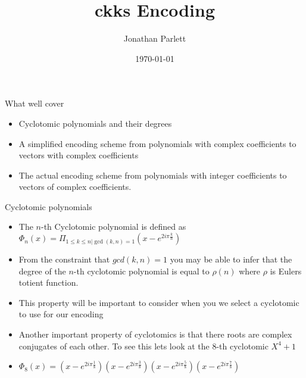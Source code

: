 \documentclass{beamer}
\title{ckks Encoding}
\author{Jonathan Parlett}
\date{\today}
\begin{document}
\begin{frame}
    \titlepage
\end{frame}


\begin{frame}{What well cover}
	\begin{itemize}[<+->]
		\item Cyclotomic polynomials and their degrees
		\item A simplified encoding scheme from polynomials with complex coefficients to
		vectors with complex coefficients
		\item The actual encoding scheme from polynomials with integer coefficients
		to vectors of complex coefficients. 
	\end{itemize}
\end{frame}

\begin{frame}{Cyclotomic polynomials}
	\begin{itemize}[<+->]
		\item The $n$-th Cyclotomic polynomial is defined as $\Phi_n(x) = \Pi_{1 \le k \le n | \gcd(k,n) = 1} (x - e^{2i\pi\frac{k}{n}})$
		\item From the constraint that $gcd(k,n) = 1$ you may be able to infer that the degree of the $n$-th
		cyclotomic polynomial is equal to $\rho(n)$ where $\rho$ is Eulers totient function.
		\item This property will be important to consider when you we select a cyclotomic to use for our
		encoding
		\item Another important property of cyclotomics is that there roots are complex conjugates
		of each other. To see this lets look at the 8-th cyclotomic $X^4 + 1$
		\item $\Phi_8(x) = (x - e^{2i \pi \frac{1}{8}})(x - e^{2i \pi \frac{3}{8}})(x - e^{2i \pi \frac{5}{8}})(x - e^{2i \pi \frac{7}{8}})$
	\end{itemize}
\end{frame}
\end{document}
